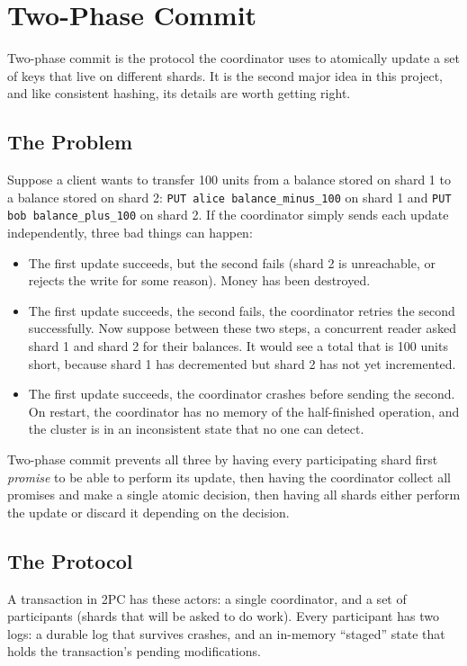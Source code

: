 \documentclass[11pt,a4paper]{article}
\begin{document}
\section{Two-Phase Commit}

Two-phase commit is the protocol the coordinator uses to atomically update a set of keys that live on different shards. It is the second major idea in this project, and like consistent hashing, its details are worth getting right.

\subsection{The Problem}
Suppose a client wants to transfer 100 units from a balance stored on shard 1 to a balance stored on shard 2: \texttt{PUT alice balance\_minus\_100} on shard 1 and \texttt{PUT bob balance\_plus\_100} on shard 2. If the coordinator simply sends each update independently, three bad things can happen:

\begin{itemize}
\item The first update succeeds, but the second fails (shard 2 is unreachable, or rejects the write for some reason). Money has been destroyed.
\item The first update succeeds, the second fails, the coordinator retries the second successfully. Now suppose between these two steps, a concurrent reader asked shard 1 and shard 2 for their balances. It would see a total that is 100 units short, because shard 1 has decremented but shard 2 has not yet incremented.
\item The first update succeeds, the coordinator crashes before sending the second. On restart, the coordinator has no memory of the half-finished operation, and the cluster is in an inconsistent state that no one can detect.
\end{itemize}

Two-phase commit prevents all three by having every participating shard first \textit{promise} to be able to perform its update, then having the coordinator collect all promises and make a single atomic decision, then having all shards either perform the update or discard it depending on the decision.

\subsection{The Protocol}

A transaction in 2PC has these actors: a single coordinator, and a set of participants (shards that will be asked to do work). Every participant has two logs: a durable log that survives crashes, and an in-memory ``staged'' state that holds the transaction's pending modifications.
\end{document}
